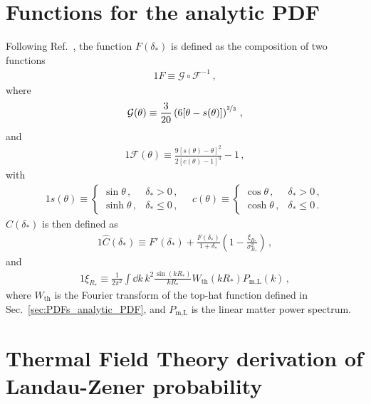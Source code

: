 \documentclass[prd,aps,10pt,nofootinbib,twocolumn,superscriptaddress,preprintnumbers,balancelastpage,longbibliography]{revtex4-1}
\begin{document}
\section{Functions for the analytic PDF}
\label{app:functions_analytic_pdf}

Following Ref.~\cite{Ivanov:2018lcg}, the function $F(\delta_*)$ is defined as the composition of two functions
%
\begin{alignat}{1}
    F \equiv \mathcal{G} \circ \mathcal{F}^{-1} \,,
\end{alignat}
%
where
%
\begin{alignat}{1}
    \mathcal{G}(\theta) \equiv \frac{3}{20} \left( 6[\theta - s(\theta)] \right)^{\nicefrac{2}{3}} \,,
\end{alignat}
%
and
%
\begin{alignat}{1}
    \mathcal{F}(\theta) \equiv \frac{9[s(\theta) - \theta]^2}{2[c(\theta) - 1]^3} - 1 \,,
\end{alignat}
%
with
%
\begin{alignat}{1}
    s(\theta) \equiv \begin{cases}
        \sin \theta\,, & \delta_* > 0 \,, \\
        \sinh \theta \,, & \delta_* \leq 0 \,,
    \end{cases} \quad
    c(\theta) \equiv \begin{cases}
        \cos \theta\,, & \delta_* > 0 \,, \\
        \cosh \theta \,, & \delta_* \leq 0 \,.
    \end{cases}
\end{alignat}
%
$\hat{C}(\delta_*)$ is then defined as
%
 \begin{alignat}{1}
     \hat{C}(\delta_*) \equiv F'(\delta_*) + \frac{F(\delta_*)}{1 + \delta_*} \left(1 - \frac{\xi_{R_*}}{\sigma^2_{R_*}}\right) \,,
 \end{alignat}
 and
 \begin{alignat}{1}
     \xi_{R_*} \equiv \frac{1}{2\pi^2} \int \dd k \, k^2 \frac{\sin(kR_*)}{kR_*} W_\text{th}(kR_*) P_\text{m,L}(k) \,,
 \end{alignat}
 where $W_\text{th}$ is the Fourier transform of the top-hat function defined in Sec.~\ref{sec:PDFs_analytic_PDF}, and $P_\text{m,L}$ is the linear matter power spectrum. 

\section{Thermal Field Theory derivation of Landau-Zener probability}
\label{app:thermal}
\end{document}
